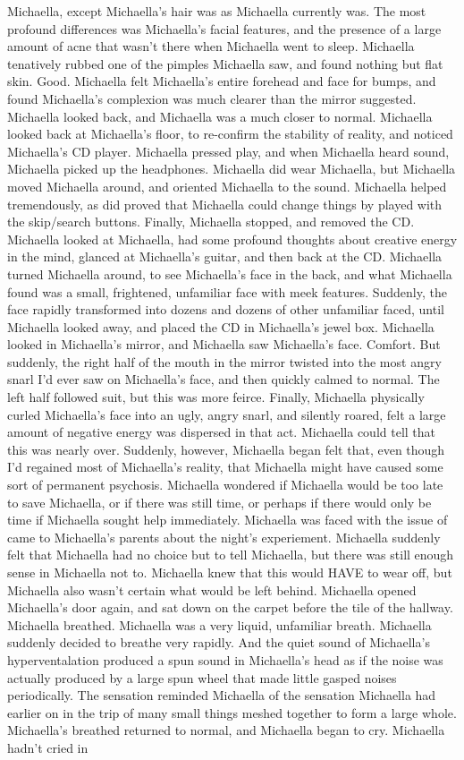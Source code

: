 \documentclass[12pt]{book}
\begin{document}
Michaella, except Michaella's hair was as Michaella currently was. The most profound differences was Michaella's facial features, and the presence of a large amount of acne that wasn't there when Michaella went to sleep. Michaella tenatively rubbed one of the pimples Michaella saw, and found nothing but flat skin. Good. Michaella felt Michaella's entire forehead and face for bumps, and found Michaella's complexion was much clearer than the mirror suggested. Michaella looked back, and Michaella was a much closer to normal. Michaella looked back at Michaella's floor, to re-confirm the stability of reality, and noticed Michaella's CD player. Michaella pressed play, and when Michaella heard sound, Michaella picked up the headphones. Michaella did wear Michaella, but Michaella moved Michaella around, and oriented Michaella to the sound. Michaella helped tremendously, as did proved that Michaella could change things by played with the skip/search buttons. Finally, Michaella stopped, and removed the CD. Michaella looked at Michaella, had some profound thoughts about creative energy in the mind, glanced at Michaella's guitar, and then back at the CD. Michaella turned Michaella around, to see Michaella's face in the back, and what Michaella found was a small, frightened, unfamiliar face with meek features. Suddenly, the face rapidly transformed into dozens and dozens of other unfamiliar faced, until Michaella looked away, and placed the CD in Michaella's jewel box. Michaella looked in Michaella's mirror, and Michaella saw Michaella's face. Comfort. But suddenly, the right half of the mouth in the mirror twisted into the most angry snarl I'd ever saw on Michaella's face, and then quickly calmed to normal. The left half followed suit, but this was more feirce. Finally, Michaella physically curled Michaella's face into an ugly, angry snarl, and silently roared, felt a large amount of negative energy was dispersed in that act. Michaella could tell that this was nearly over. Suddenly, however, Michaella began felt that, even though I'd regained most of Michaella's reality, that Michaella might have caused some sort of permanent psychosis. Michaella wondered if Michaella would be too late to save Michaella, or if there was still time, or perhaps if there would only be time if Michaella sought help immediately. Michaella was faced with the issue of came to Michaella's parents about the night's experiement. Michaella suddenly felt that Michaella had no choice but to tell Michaella, but there was still enough sense in Michaella not to. Michaella knew that this would HAVE to wear off, but Michaella also wasn't certain what would be left behind. Michaella opened Michaella's door again, and sat down on the carpet before the tile of the hallway. Michaella breathed. Michaella was a very liquid, unfamiliar breath. Michaella suddenly decided to breathe very rapidly. And the quiet sound of Michaella's hyperventalation produced a spun sound in Michaella's head as if the noise was actually produced by a large spun wheel that made little gasped noises periodically. The sensation reminded Michaella of the sensation Michaella had earlier on in the trip of many small things meshed together to form a large whole. Michaella's breathed returned to normal, and Michaella began to cry. Michaella hadn't cried in 
\end{document}
